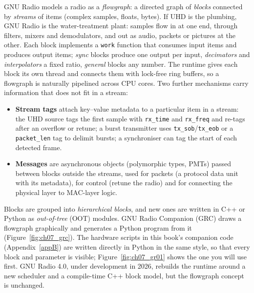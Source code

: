 GNU Radio models a radio as a \emph{flowgraph}: a directed graph of \emph{blocks} connected by
\emph{streams} of items (complex samples, floats, bytes). If UHD is the plumbing, GNU Radio is the
water-treatment plant: samples flow in at one end, through filters, mixers and demodulators, and out
as audio, packets or pictures at the other. Each block implements a \texttt{work} function
that consumes input items and produces output items; \emph{sync} blocks produce one output per input,
\emph{decimators} and \emph{interpolators} a fixed ratio, \emph{general} blocks any number. The runtime
gives each block its own thread and connects them with lock-free ring buffers, so a flowgraph is
naturally pipelined across CPU cores. Two further mechanisms carry information that does not fit in a
stream:
\begin{itemize}
\item \textbf{Stream tags} attach key--value metadata to a particular item in a stream: the UHD source
tags the first sample with \texttt{rx\_time} and \texttt{rx\_freq} and re-tags after an overflow or retune;
a burst transmitter uses \texttt{tx\_sob}/\texttt{tx\_eob} or a \texttt{packet\_len} tag to delimit
bursts; a synchroniser can tag the start of each detected frame.
\item \textbf{Messages} are asynchronous objects (polymorphic types, PMTs) passed between blocks outside
the streams, used for packets (a protocol data unit with its metadata), for control (retune the radio) and
for connecting the physical layer to MAC-layer logic.
\end{itemize}
Blocks are grouped into \emph{hierarchical blocks}, and new ones are written in C++ or Python as
\emph{out-of-tree} (OOT) modules. GNU Radio Companion (GRC) draws a flowgraph graphically and generates a
Python program from it (Figure~\ref{fig:ch07_grc}). The hardware scripts in this book's companion code
(Appendix~\ref{appB}) are written directly in Python in the same style, so that every block and parameter
is visible; Figure~\ref{fig:ch07_gr01} shows the one you will use first. GNU Radio 4.0, under development
in 2026, rebuilds the runtime around a new scheduler and a compile-time C++ block model, but the
flowgraph concept is unchanged.

